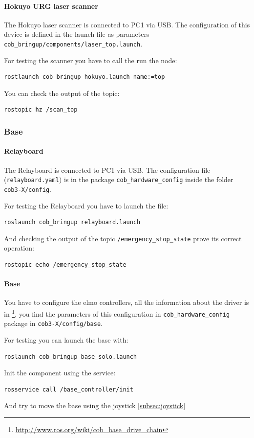 \paragraph{Hokuyo URG laser scanner}
The Hokuyo laser scanner is connected to PC1 via USB. The configuration of this device is defined in the launch file as parameters \texttt{cob\_bringup/components/laser\_top.launch}.

For testing the scanner you have to call the run the node:
\begin{lstlisting}
rostlaunch cob_bringup hokuyo.launch name:=top
\end{lstlisting}

You can check the output of the topic:
\begin{lstlisting}
rostopic hz /scan_top
\end{lstlisting}

\subsubsection{Base}

\paragraph{Relayboard}
The Relayboard is connected to PC1 via USB. The configuration file (\texttt{relayboard.yaml}) is in the package \texttt{cob\_hardware\_config} inside the folder \texttt{cob3-X/config}.

For testing the Relayboard you have to launch the file:
\begin{lstlisting}
roslaunch cob_bringup relayboard.launch
\end{lstlisting}

And checking the output of the topic \texttt{/emergency\_stop\_state} prove its correct operation:
\begin{lstlisting}
rostopic echo /emergency_stop_state
\end{lstlisting}

\paragraph{Base}
You have to configure the elmo controllers, all the information about the driver is in \footnote{\url{http://www.ros.org/wiki/cob_base_drive_chain}}, you find the parameters of this configuration in \texttt{cob\_hardware\_config} package in \texttt{cob3-X/config/base}.

For testing you can launch the base with:
\begin{lstlisting}
roslaunch cob_bringup base_solo.launch
\end{lstlisting}
Init the component using the service:
\begin{lstlisting}
rosservice call /base_controller/init
\end{lstlisting}
And try to move the base using the joystick \ref{subsec:joystick}

